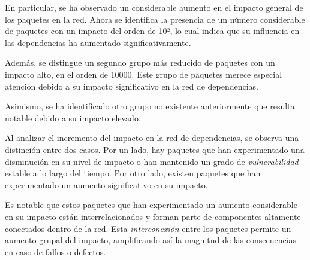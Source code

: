 En particular, se ha observado un considerable aumento en el impacto general de los paquetes en la
red. Ahora se identifica la presencia de un número considerable de paquetes con un impacto del orden
de 10², lo cual indica que su influencia en las dependencias ha aumentado
significativamente.

Además, se distingue un segundo grupo más reducido de paquetes con un impacto alto, en el orden de 10000.
Este grupo de paquetes merece especial atención debido a su impacto significativo
en la red de dependencias.

Asimismo, se ha identificado otro grupo no existente anteriormente que resulta notable debido a
su impacto elevado.


Al analizar el incremento del impacto en la red de dependencias, se observa una distinción entre
dos casos. Por un lado, hay paquetes que han experimentado una disminución en su nivel de impacto
o han mantenido un grado de \emph{vulnerabilidad} estable a lo largo del tiempo. Por otro lado,
existen paquetes que han experimentado un aumento significativo en su impacto.

Es notable que estos paquetes que han experimentado un aumento considerable en su impacto
están interrelacionados y forman parte de componentes altamente conectados dentro de la red.
Esta \emph{interconexión} entre los paquetes permite un aumento grupal del impacto, amplificando
así la magnitud de las consecuencias en caso de fallos o defectos.

